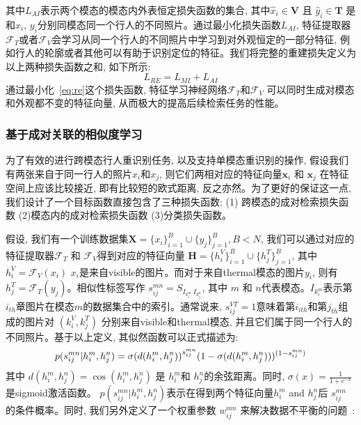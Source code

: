  其中$L_{A I}$表示两个模态的模态内外表恒定损失函数的集合, 其中$\hat{x}_i \in \mathbf{V}$ 且 $\hat{y}_i \in \mathbf{T}$ 是和$x_i$, $y_i$分别同模态同一个行人的不同照片。通过最小化损失函数$L_{A I}$, 特征提取器 $\mathcal{F}_T$或者$\mathcal{F}_V$会学习从同一个行人的不同照片中学习到对外观恒定的一部分特征, 例如行人的轮廓或者其他可以有助于识别定位的特征。我们将完整的重建损失定义为以上两种损失函数之和, 如下所示:
  \begin{equation}
    L_{RE} = L_{MI} +L_{AI}
    \label{eq:re}
\end{equation}
通过最小化~\ref{eq:re}这个损失函数, 特征学习神经网络$\mathcal{F}_T$和$\mathcal{F}_V$ 可以同时生成对模态和外观都不变的特征向量, 从而极大的提高后续检索任务的性能。
\subsubsection{基于成对关联的相似度学习}
为了有效的进行跨模态行人重识别任务, 以及支持单模态重识别的操作, 假设我们有两张来自于同一行人的照片$x_i$和$x_j$, 则它们两相对应的特征向量$\mathbf{x}_i$ 和 $\mathbf{x}_j$ 在特征空间上应该比较接近, 即有比较短的欧式距离, 反之亦然。为了更好的保证这一点, 我们设计了一个目标函数直接包含了三种损失函数: (1) 跨模态的成对检索损失函数 (2)模态内的成对检索损失函数 (3)分类损失函数。\par
假设, 我们有一个训练数据集$\mathbf{X}= \{x_i\}^B_{i=1}\cup\{y_j\}^B_{j=1}, B < N$, 我们可以通过对应的特征提取器$\mathcal{F}_T$ 和  $\mathcal{F}_V$得到对应的特征向量 $\mathbf{H} = \{h_i^V\}_{i=1}^B\cup\{h_j^T\}^B_{j=1}$, 其中 $h_i^V = \mathcal{F}_V(x_i)$ $x_i$是来自visible的图片。而对于来自thermal模态的图片$y_i$, 则有 $h_j^T = \mathcal{F}_T(y_j)$。相似性标签写作 $s^{mn}_{ij} = S_{I_{k_i^m}~I_{k_j^n}}$, 其中 $m$ 和 $n$代表模态。$I_{k^m_i}$表示第$i_{th}$章图片在模态$m$的数据集合中的索引。通常说来, $s^{VT}_{ij}=1$意味着第$i_{ith}$和第$j_{th}$组成的图片对 $(k^V_i,k^T_j)$ 分别来自visible和thermal模态, 并且它们属于同一个行人的不同照片。基于以上定义, 其似然函数可以正式描述为:
\begin{equation}
  p(s^{mn}_{ij}|h_i^m,h_j^n) = \sigma{(d(h_i^m,h_j^n))}^{s^{mn}_{ij}}(1 - \sigma{(d(h_i^m,h_j^n))})^{(1-s^{mn}_{ij})} \label{con:conditional} \\
\end{equation}
其中 $d(h_i^m,h_j^n) = \cos{(h_i^m,h_j^n)}$ 是 $h_i^m$和 $h_j^n$的余弦距离。同时, $\sigma(x) = \frac{1}{1+e^{-x}}$ 是sigmoid激活函数。 $ p(s^{mn}_{ij}|h_i^m,h_j^n)$表示在得到两个特征向量$h_i^m$ and $h_j^n$后 $s^{mn}_{ij}$ 的条件概率。同时, 我们另外定义了一个权重参数 $w_{ij}^{mn}$ 来解决数据不平衡的问题~\cite{cao2018deep}:
